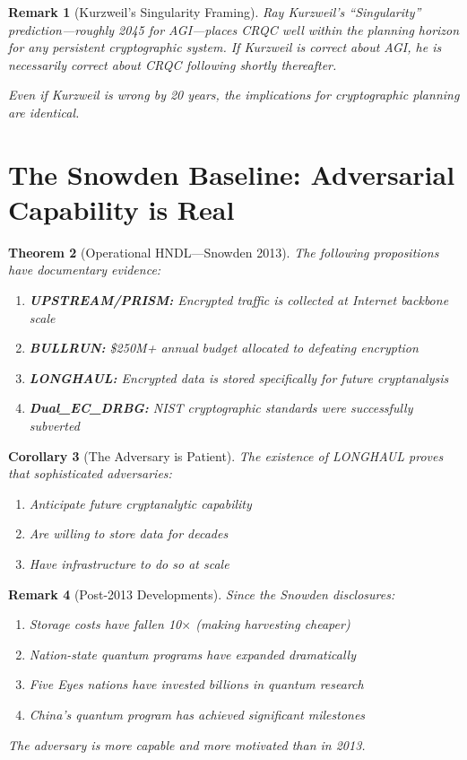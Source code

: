 \documentclass[11pt,a4paper]{article}
\newtheorem{theorem}{Theorem}[section]
\newtheorem{corollary}[theorem]{Corollary}
\newtheorem{remark}[theorem]{Remark}
\begin{document}
\begin{remark}[Kurzweil's Singularity Framing]
Ray Kurzweil's ``Singularity'' prediction---roughly 2045 for AGI---places CRQC well within the planning horizon for any persistent cryptographic system. If Kurzweil is correct about AGI, he is necessarily correct about CRQC following shortly thereafter.

Even if Kurzweil is wrong by 20 years, the implications for cryptographic planning are identical.
\end{remark}

\section{The Snowden Baseline: Adversarial Capability is Real}

\begin{theorem}[Operational HNDL---Snowden 2013]
The following propositions have documentary evidence:
\begin{enumerate}[noitemsep]
    \item \textbf{UPSTREAM/PRISM:} Encrypted traffic is collected at Internet backbone scale
    \item \textbf{BULLRUN:} \$250M+ annual budget allocated to defeating encryption
    \item \textbf{LONGHAUL:} Encrypted data is stored specifically for future cryptanalysis
    \item \textbf{Dual\_EC\_DRBG:} NIST cryptographic standards were successfully subverted
\end{enumerate}
\end{theorem}

\begin{corollary}[The Adversary is Patient]
The existence of LONGHAUL proves that sophisticated adversaries:
\begin{enumerate}[noitemsep]
    \item Anticipate future cryptanalytic capability
    \item Are willing to store data for decades
    \item Have infrastructure to do so at scale
\end{enumerate}
\end{corollary}

\begin{remark}[Post-2013 Developments]
Since the Snowden disclosures:
\begin{enumerate}[noitemsep]
    \item Storage costs have fallen 10$\times$ (making harvesting cheaper)
    \item Nation-state quantum programs have expanded dramatically
    \item Five Eyes nations have invested billions in quantum research
    \item China's quantum program has achieved significant milestones
\end{enumerate}
The adversary is more capable and more motivated than in 2013.
\end{remark}
\end{document}
